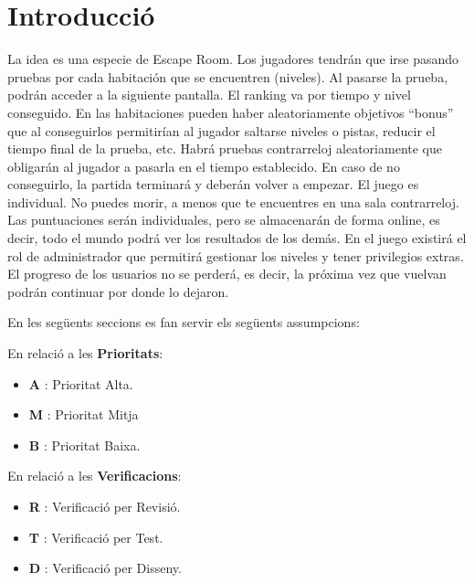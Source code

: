 \section{Introducció}\label{sec:intro}


La idea es una especie de Escape Room. Los jugadores tendrán que irse pasando pruebas por cada habitación que se encuentren (niveles). Al pasarse la prueba, podrán acceder a la siguiente pantalla. El ranking va por tiempo y nivel conseguido. En las habitaciones pueden haber aleatoriamente objetivos “bonus” que al conseguirlos permitirían al jugador saltarse niveles o pistas, reducir el tiempo final de la prueba, etc.
Habrá pruebas contrarreloj aleatoriamente que obligarán al jugador a pasarla en el tiempo establecido. En caso de no conseguirlo, la partida terminará y deberán volver a empezar.
El juego es individual. No puedes morir, a menos que te encuentres en una sala contrarreloj. 
Las puntuaciones serán individuales, pero se almacenarán de forma online, es decir, todo el mundo podrá ver los resultados de los demás.
En el juego existirá el rol de administrador que permitirá gestionar los niveles y tener privilegios extras.
El progreso de los usuarios no se perderá, es decir, la próxima vez que vuelvan podrán continuar por donde lo dejaron.



En les següents seccions es fan servir els següents assumpcions:

En relació a les \textbf{Prioritats}:

\begin{itemize}
\item  \textbf{A} : Prioritat Alta.
\item  \textbf{M} : Prioritat Mitja
\item  \textbf{B} : Prioritat Baixa.
\end{itemize}

En relació a les \textbf{Verificacions}:

\begin{itemize}
\item  \textbf{R} : Verificació per Revisió.
\item  \textbf{T} : Verificació per Test.
\item  \textbf{D} : Verificació per Disseny.
\end{itemize}
